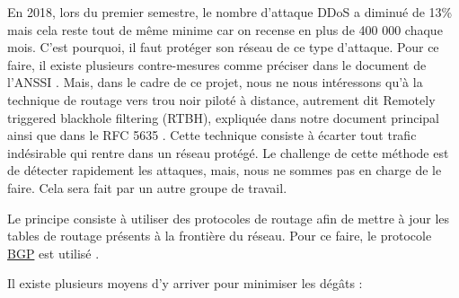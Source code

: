 \vspace{2em}

En 2018, lors du premier semestre, le nombre d'attaque DDoS a diminué de 13\% mais cela reste tout de même minime car on recense en plus de 400 000 chaque mois. C'est pourquoi, il faut protéger son réseau de ce type d'attaque. Pour ce faire, il existe plusieurs contre-mesures comme préciser dans le document de l'ANSSI \cite{Ans15}. Mais, dans le cadre de ce projet, nous ne nous intéressons qu'à la technique de routage vers trou noir piloté à distance, autrement dit Remotely triggered blackhole filtering (RTBH), expliquée dans notre document principal \cite{Sys05} ainsi que dans le RFC 5635 \cite{Rfcrtbh09}. Cette technique consiste à écarter tout trafic indésirable qui rentre dans un réseau protégé. Le challenge de cette méthode est de détecter rapidement les attaques, mais, nous ne sommes pas en charge de le faire. Cela sera fait par un autre groupe de travail.

Le principe consiste à utiliser des protocoles de routage afin de mettre à jour les tables de routage présents à la frontière du réseau. Pour ce faire, le protocole \hyperref[sec:BGP]{BGP} est utilisé \cite{Rfcbgp06}.

Il existe plusieurs moyens d'y arriver pour minimiser les dégâts :

